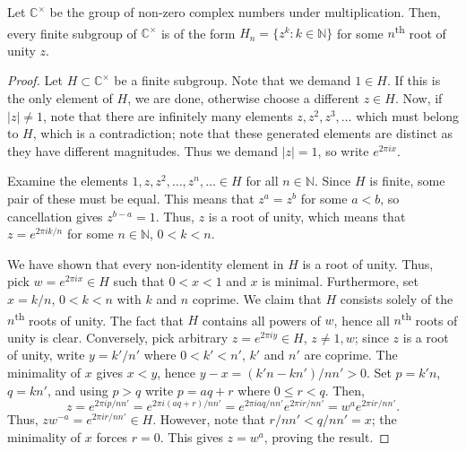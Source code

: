 \documentclass[11pt]{article}
\newcommand{\C}{\mathbb{C}}
\newcommand{\N}{\mathbb{N}}
\theoremstyle{definition}
\theoremstyle{remark}
\numberwithin{equation}{section}
\begin{document}
    \begin{theorem}
        Let $\C^\times$ be the group of non-zero complex numbers under
        multiplication. Then, every finite subgroup of $\C^\times$ is of the form
        $H_n = \{z^k : k \in \N\}$ for some $n$\textsuperscript{th} root of unity
        $z$.
    \end{theorem}
    \begin{proof}
        Let $H \subset \C^\times$ be a finite subgroup. Note that we demand $1 \in
        H$. If this is the only element of $H$, we are done, otherwise choose a
        different $z \in H$. Now, if $|z| \neq 1$, note that there are infinitely
        many elements $z, z^2, z^3, \dots$ which must belong to $H$, which is a
        contradiction; note that these generated elements are distinct as they have
        different magnitudes. Thus we demand $|z| = 1$, so write $e^{2\pi ix}$.

        Examine the elements $1, z, z^2, \dots, z^n, \dots \in H$ for all $n \in \N$.
        Since $H$ is finite, some pair of these must be equal. This means that $z^a =
        z^b$ for some $a < b$, so cancellation gives $z^{b - a} = 1$. Thus, $z$ is a
        root of unity, which means that $z = e^{2\pi i k / n}$ for some $n
        \in \N$, $0 < k < n$.

        We have shown that every non-identity element in $H$ is a root of unity.
        Thus, pick $w = e^{2\pi ix} \in H$ such that $0 < x < 1$ and $x$ is minimal.
        Furthermore, set $x = k / n$, $0 < k < n$ with $k$ and $n$ coprime. We claim
        that $H$ consists solely of the $n$\textsuperscript{th} roots of unity. The
        fact that $H$ contains all powers of $w$, hence all $n$\textsuperscript{th}
        roots of unity is clear. Conversely, pick arbitrary $z = e^{2\pi i y} \in H$,
        $z \neq 1, w$; since $z$ is a root of unity, write $y = k' / n'$ where $0 <
        k' < n'$, $k'$ and $n'$ are coprime. The minimality of $x$ gives $x < y$,
        hence $y - x = (k'n - kn') / n n' > 0$. Set $p = k'n$, $q = kn'$, and using
        $p > q$ write $p = aq + r$ where $0 \leq r < q$. Then, \[
            z = e^{2\pi i p / nn'} = e^{2\pi i (aq + r) / n n'} = e^{2\pi i aq / nn'}
            e^{2\pi i r / n n'} = w^a e^{2\pi i r / n n'}.
        \] Thus, $z w^{-a} = e^{2\pi i r / n n'} \in H$. However, note that $r / nn'
        < q / nn' = x$; the minimality of $x$ forces $r = 0$. This gives $z = w^a$,
        proving the result.
    \end{proof}
\end{document}
